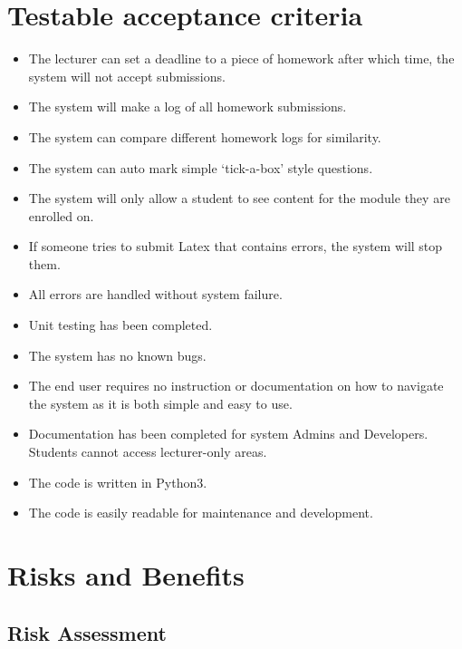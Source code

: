 \documentclass[12pt]{article}
\begin{document}
	\section{Testable acceptance criteria}
    	\midskip
	\begin{itemize}
	\item The lecturer can set a deadline to a piece of homework after which time, the system will not accept submissions.
	\item The system will make a log of all homework submissions.
	\item The system can compare different homework logs for similarity.
	\item The system can auto mark simple ‘tick-a-box’ style questions.
	\item The system will only allow a student to see content for the module they are enrolled on.
	\item If someone tries to submit Latex that contains errors, the system will stop them.
	\item All errors are handled without system failure.
	\item Unit testing has been completed.
	\item The system has no known bugs.
	\item The end user requires no instruction or documentation on how to navigate the system as it is both simple and easy to use.
	\item Documentation has been completed for system Admins and Developers.
	Students cannot access lecturer-only areas.
	\item The code is written in Python3.
	\item The code is easily readable for maintenance and development.
	\end{itemize}
	

          	
	\section{Risks and Benefits}
		\subsection{Risk Assessment}
			
			
\end{document}
